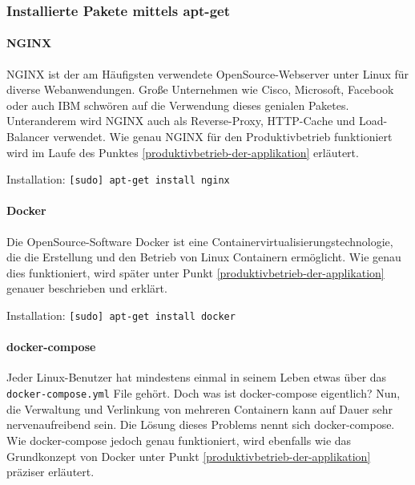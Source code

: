 \hypertarget{installierte-pakete-mittels-apt-get}{%
\subsubsection{Installierte Pakete mittels
apt-get}\label{installierte-pakete-mittels-apt-get}}

\hypertarget{nginx}{%
\paragraph{NGINX}\label{nginx}}

NGINX ist der am Häufigsten verwendete OpenSource-Webserver unter Linux
für diverse Webanwendungen. Große Unternehmen wie Cisco, Microsoft,
Facebook oder auch IBM schwören auf die Verwendung dieses genialen
Paketes. Unteranderem wird NGINX auch als Reverse-Proxy, HTTP-Cache und
Load-Balancer verwendet. Wie genau NGINX für den Produktivbetrieb
funktioniert wird im Laufe des Punktes
\ref{produktivbetrieb-der-applikation} erläutert.

Installation: \texttt{{[}sudo{]}\ apt-get\ install\ nginx}

\hypertarget{docker}{%
\paragraph{Docker}\label{docker}}

Die OpenSource-Software Docker ist eine
Containervirtualisierungstechnologie, die die Erstellung und den Betrieb
von Linux Containern ermöglicht. Wie genau dies funktioniert, wird
später unter Punkt \ref{produktivbetrieb-der-applikation} genauer
beschrieben und erklärt.

Installation: \texttt{{[}sudo{]}\ apt-get\ install\ docker}

\hypertarget{docker-compose}{%
\paragraph{docker-compose}\label{docker-compose}}

Jeder Linux-Benutzer hat mindestens einmal in seinem Leben etwas über
das \texttt{docker-compose.yml} File gehört. Doch was ist docker-compose
eigentlich? Nun, die Verwaltung und Verlinkung von mehreren Containern
kann auf Dauer sehr nervenaufreibend sein. Die Lösung dieses Problems
nennt sich docker-compose. Wie docker-compose jedoch genau funktioniert,
wird ebenfalls wie das Grundkonzept von Docker unter Punkt
\ref{produktivbetrieb-der-applikation} präziser erläutert.

